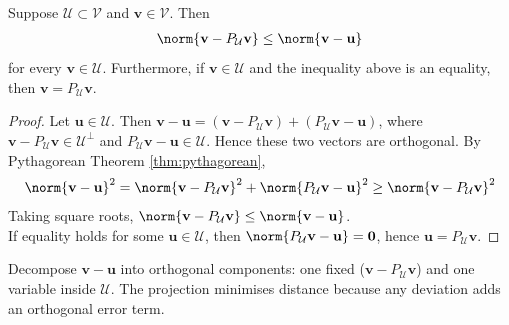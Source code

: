 \begin{proposition} Suppose $\mathcal{U} \subset \mathcal{V}$ and $\mathbf{v} \in \mathcal{V}$. Then
\begin{align}
\norm{\mathbf{v} - P_{\mathcal{U}} \mathbf{v}} \leq \norm{\mathbf{v} - \mathbf{u}} \nonumber
\end{align}
for every $\mathbf{v} \in \mathcal{U}$. Furthermore, if $\mathbf{v} \in \mathcal{U}$ and the inequality above is an equality, then $\mathbf{v} = P_{\mathcal{U}} \mathbf{v}$.
\begin{proof} Let $\mathbf{u} \in \mathcal{U}$. Then $\mathbf{v} - \mathbf{u} = (\mathbf{v} - P_{\mathcal{U}}\mathbf{v}) + (P_{\mathcal{U}}\mathbf{v} - \mathbf{u})$, where $\mathbf{v} - P_{\mathcal{U}}\mathbf{v} \in \mathcal{U}^{\perp}$ and $P_{\mathcal{U}}\mathbf{v} - \mathbf{u} \in \mathcal{U}$. Hence these two vectors are orthogonal. By Pythagorean Theorem \ref{thm:pythagorean},
\begin{align}
\norm{\mathbf{v} - \mathbf{u}}^2 = \norm{\mathbf{v} - P_{\mathcal{U}}\mathbf{v}}^2 + \norm{P_{\mathcal{U}}\mathbf{v} - \mathbf{u}}^2 \geq \norm{\mathbf{v} - P_{\mathcal{U}}\mathbf{v}}^2 \nonumber
\end{align}
Taking square roots, $\norm{\mathbf{v} - P_{\mathcal{U}}\mathbf{v}} \leq \norm{\mathbf{v} - \mathbf{u}}$.\\
If equality holds for some $\mathbf{u} \in \mathcal{U}$, then $\norm{P_{\mathcal{U}}\mathbf{v} - \mathbf{u}} = \mathbf{0}$, hence $\mathbf{u} = P_{\mathcal{U}}\mathbf{v}$.
\end{proof}
\end{proposition}

Decompose $\mathbf{v} - \mathbf{u}$ into orthogonal components: one fixed ($\mathbf{v} - P_{\mathcal{U}}\mathbf{v}$) and one variable inside $\mathcal{U}$. The projection minimises distance because any deviation adds an orthogonal error term.

